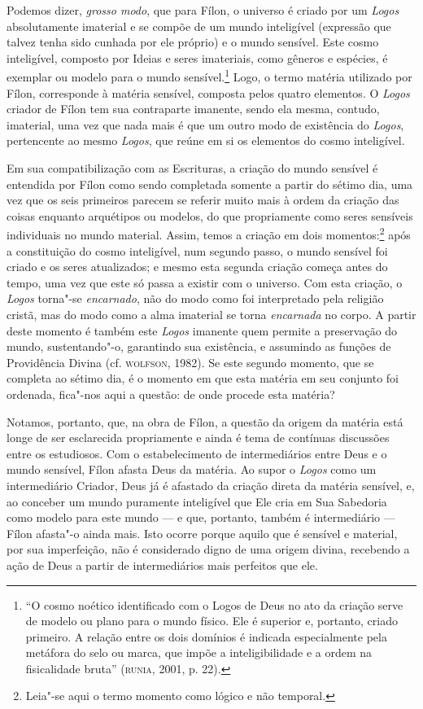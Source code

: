 Podemos dizer, \emph{grosso modo}, que para Fílon, o universo é
criado por um \emph{Logos} absolutamente imaterial e se compõe de
um mundo inteligível (expressão que talvez tenha sido cunhada por ele
próprio) e o mundo sensível. Este cosmo inteligível, composto por
Ideias e seres imateriais, como gêneros e espécies, é exemplar ou
modelo para o mundo sensível.\footnote{ “O cosmo noético identificado
com o Logos de Deus no ato da criação serve de modelo ou plano para o
mundo físico. Ele é superior e, portanto, criado primeiro. A relação
entre os dois domínios é indicada especialmente pela metáfora do selo
ou marca, que impõe a inteligibilidade e a ordem na fisicalidade
bruta” (\textsc{runia}, 2001, p. 22).} Logo, o termo matéria utilizado por
Fílon, corresponde à matéria sensível, composta pelos quatro
elementos. O \emph{Logos} criador de Fílon tem sua contraparte
imanente, sendo ela mesma, contudo, imaterial, uma vez que nada mais
é que um outro modo de existência do \emph{Logos}, pertencente ao
mesmo \emph{Logos}, que reúne em si os elementos do cosmo
inteligível. 

Em sua compatibilização com as Escrituras, a criação do mundo sensível
é entendida por Fílon como sendo completada somente a partir do
sétimo dia, uma vez que os seis primeiros parecem se referir muito
mais à ordem da criação das coisas enquanto arquétipos ou modelos, do
que propriamente como seres sensíveis individuais no mundo material.
Assim, temos a criação em dois momentos:\footnote{ Leia"-se aqui o
termo momento como lógico e não temporal.} após a constituição do
cosmo inteligível, num segundo passo, o mundo sensível foi criado e
os seres atualizados; e mesmo esta segunda criação começa antes do
tempo, uma vez que este só passa a existir com o universo. Com esta
criação, o \emph{Logos} torna"-se \emph{encarnado}, não do modo
como foi interpretado pela religião cristã, mas do modo como a alma
imaterial se torna \emph{encarnada} no corpo. A partir deste
momento é também este \emph{Logos} imanente quem permite a
preservação do mundo, sustentando"-o, garantindo sua existência, e
assumindo as funções de Providência Divina (cf. \textsc{wolfson}, 1982). Se
este segundo momento, que se completa ao sétimo dia, é o momento em
que esta matéria em seu conjunto foi ordenada, fica"-nos aqui a
questão: de onde procede esta matéria? 

Notamos, portanto, que, na obra de Fílon, a questão da origem da
matéria está longe de ser esclarecida propriamente e ainda é tema de
contínuas discussões entre os estudiosos. Com o estabelecimento de
intermediários entre Deus e o mundo sensível, Fílon afasta Deus da
matéria. Ao supor o \emph{Logos} como um intermediário Criador,
Deus já é afastado da criação direta da matéria sensível, e, ao
conceber um mundo puramente inteligível que Ele cria em Sua Sabedoria
como modelo para este mundo --- e que, portanto, também é intermediário
--- Fílon afasta"-o ainda mais. Isto ocorre porque aquilo que é sensível
e material, por sua imperfeição, não é considerado digno de uma
origem divina, recebendo a ação de Deus a partir de intermediários
mais perfeitos que ele.


